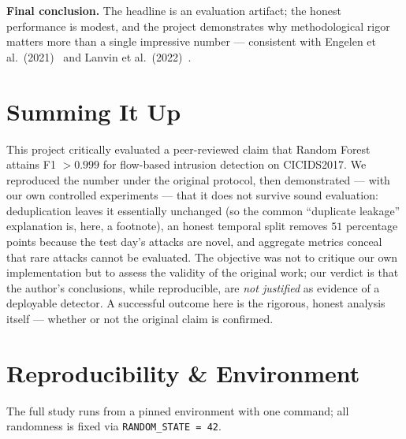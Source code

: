 \documentclass[11pt,a4paper]{article}
\begin{document}
\textbf{Final conclusion.} The headline is an evaluation artifact; the honest performance is
modest, and the project demonstrates why methodological rigor matters more than a single
impressive number --- consistent with Engelen et al.\ (2021)~\cite{engelen2021} and
Lanvin et al.\ (2022)~\cite{lanvin2022}.

\section{Summing It Up}
This project critically evaluated a peer-reviewed claim that Random Forest attains
F1 $>0.999$ for flow-based intrusion detection on CICIDS2017. We reproduced the number under
the original protocol, then demonstrated --- with our own controlled experiments --- that it
does not survive sound evaluation: deduplication leaves it essentially unchanged (so the
common ``duplicate leakage'' explanation is, here, a footnote), an honest temporal split
removes $51$ percentage points because the test day's attacks are novel, and aggregate metrics
conceal that rare attacks cannot be evaluated. The objective was not to critique our own
implementation but to assess the validity of the original work; our verdict is that the
author's conclusions, while reproducible, are \emph{not justified} as evidence of a deployable
detector. A successful outcome here is the rigorous, honest analysis itself --- whether or not
the original claim is confirmed.

\appendix

\section{Reproducibility \& Environment}
The full study runs from a pinned environment with one command; all randomness is fixed via
\texttt{RANDOM\_STATE = 42}.
\end{document}

